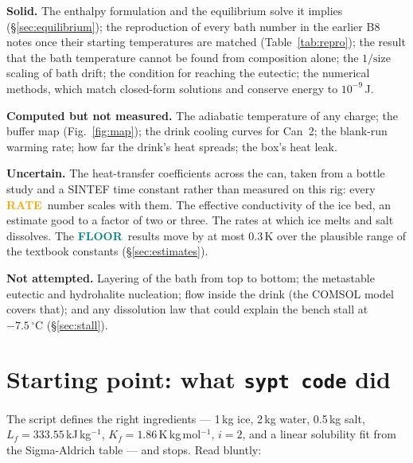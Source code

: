 \documentclass[11pt,a4paper]{article}
\newcommand{\dC}{\,^{\circ}\mathrm{C}}
\newcommand{\code}[1]{\texttt{#1}}
\newcommand{\FLOOR}{\textcolor{teal}{\textsf{\bfseries FLOOR}}}
\newcommand{\RATE}{\textcolor{orange}{\textsf{\bfseries RATE}}}
\begin{document}
\textbf{Solid.} The enthalpy formulation and the equilibrium solve it implies (§\ref{sec:equilibrium});
the reproduction of every bath number in the earlier B8 notes once their starting temperatures are
matched (Table~\ref{tab:repro}); the result that the bath temperature cannot be found from composition
alone; the $1/\text{size}$ scaling of bath drift; the condition for reaching the eutectic; the
numerical methods, which match closed-form solutions and conserve energy to $10^{-9}$\,J.

\textbf{Computed but not measured.} The adiabatic temperature of any charge; the buffer map
(Fig.~\ref{fig:map}); the drink cooling curves for Can~2; the blank-run warming rate; how far the
drink's heat spreads; the box's heat leak.

\textbf{Uncertain.} The heat-transfer coefficients across the can, taken from a bottle study and a
SINTEF time constant rather than measured on this rig: every \RATE\ number scales with them. The
effective conductivity of the ice bed, an estimate good to a factor of two or three. The rates at
which ice melts and salt dissolves. The \FLOOR\ results move by at most 0.3\,K over the plausible
range of the textbook constants (§\ref{sec:estimates}).

\textbf{Not attempted.} Layering of the bath from top to bottom; the metastable eutectic and
hydrohalite nucleation; flow inside the drink (the COMSOL model covers that); and any dissolution law
that could explain the bench stall at $-7.5\dC$ (§\ref{sec:stall}).

\section{Starting point: what \code{sypt code} did}
\label{sec:start}

The script defines the right ingredients — 1\,kg ice, 2\,kg water, 0.5\,kg salt, $L_f =
333.55$\,kJ\,kg$^{-1}$, $K_f = 1.86$\,K\,kg\,mol$^{-1}$, $i = 2$, and a linear solubility fit
from the Sigma-Aldrich table — and stops. Read bluntly:
\end{document}
